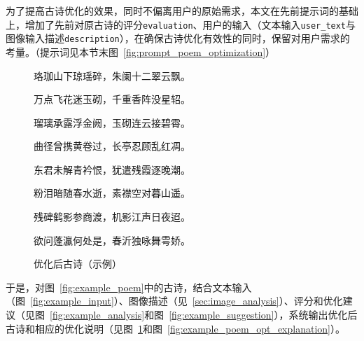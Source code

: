 



为了提高古诗优化的效果，同时不偏离用户的原始需求，本文在先前提示词的基础上，增加了先前对原古诗的评分\verb|evaluation|、用户的输入（文本输入\verb|user_text|与图像输入描述\verb|description|），在确保古诗优化有效性的同时，保留对用户需求的考量。（提示词见本节末图~\ref{fig:prompt_poem_optimization}）

\begin{figure}[ht]
  \centering
  \begin{tcolorbox}[
      colback=white,
      colframe=black,
      boxrule=1pt,
      arc=0mm,
      width=0.6\linewidth,  %
      ]
      \kaishu
      \centering
      珞珈山下琼瑶碎，朱阑十二翠云飘。\par
      万点飞花迷玉砌，千重香阵没星轺。\par
      瑠璃承露浮金阙，玉砌连云接碧霄。\par
      曲径曾携黄卷过，长亭忍顾乱红凋。\par
      东君未解青衿恨，犹遣残霞逐晚潮。\par
      粉泪暗随春水逝，素襟空对暮山遥。\par
      残碑鹤影参商渡，机影江声日夜迢。\par
      欲问蓬瀛何处是，春沂独咏舞雩娇。\par
  \end{tcolorbox}
  \caption{优化后古诗（示例）}
  \label{fig:example_poem_optimized}
\end{figure}

于是，对图~\ref{fig:example_poem}中的古诗，结合文本输入（图~\ref{fig:example_input}）、图像描述（见~\ref{sec:image_analysis}）、评分和优化建议（见图~\ref{fig:example_analysis}和图~\ref{fig:example_suggestion}），系统输出优化后古诗和相应的优化说明（见图~\ref{fig:example_poem_optimized}和图~\ref{fig:example_poem_opt_explanation}）。

